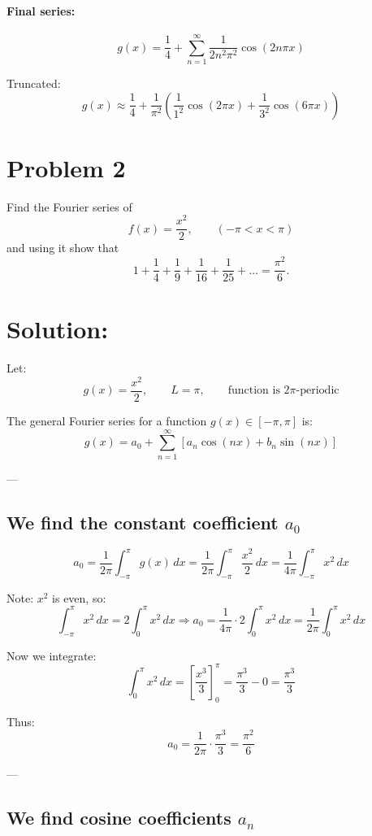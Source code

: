 \documentclass{article}
\begin{document}
\paragraph{Final series:}
\[
g(x) = \frac{1}{4} + \sum_{n=1}^\infty \frac{1}{2n^2\pi^2} \cos(2n\pi x)
\]

Truncated:
\[
g(x) \approx \frac{1}{4} + \frac{1}{\pi^2} \left( \frac{1}{1^2} \cos(2\pi x) + \frac{1}{3^2} \cos(6\pi x) \right)
\]


\newpage
\section*{Problem 2}

\noindent
Find the Fourier series of
\[
f(x) = \frac{x^2}{2}, \qquad (-\pi < x < \pi)
\]
and using it show that
\[
1 + \frac{1}{4} + \frac{1}{9} + \frac{1}{16} + \frac{1}{25} + \dots = \frac{\pi^2}{6}.
\]

\section*{Solution:}
Let:
\[
g(x) = \frac{x^2}{2}, \qquad L = \pi, \qquad \text{function is } 2\pi\text{-periodic}
\]

The general Fourier series for a function \( g(x) \in [-\pi, \pi] \) is:
\[
g(x) = a_0 + \sum_{n=1}^{\infty} \left[ a_n \cos(nx) + b_n \sin(nx) \right]
\]

---

\subsection*{We find the constant coefficient \( a_0 \)}

\[
a_0 = \frac{1}{2\pi} \int_{-\pi}^{\pi} g(x) \, dx = \frac{1}{2\pi} \int_{-\pi}^{\pi} \frac{x^2}{2} \, dx = \frac{1}{4\pi} \int_{-\pi}^{\pi} x^2 \, dx
\]

Note: \( x^2 \) is even, so:
\[
\int_{-\pi}^{\pi} x^2 \, dx = 2 \int_0^{\pi} x^2 \, dx
\Rightarrow a_0 = \frac{1}{4\pi} \cdot 2 \int_0^{\pi} x^2 \, dx = \frac{1}{2\pi} \int_0^{\pi} x^2 \, dx
\]

Now we integrate:
\[
\int_0^{\pi} x^2 \, dx = \left[ \frac{x^3}{3} \right]_0^{\pi} = \frac{\pi^3}{3} - 0 = \frac{\pi^3}{3}
\]

Thus:
\[
a_0 = \frac{1}{2\pi} \cdot \frac{\pi^3}{3} = \frac{\pi^2}{6}
\]

---

\subsection*{We find cosine coefficients \( a_n \)}
\end{document}
